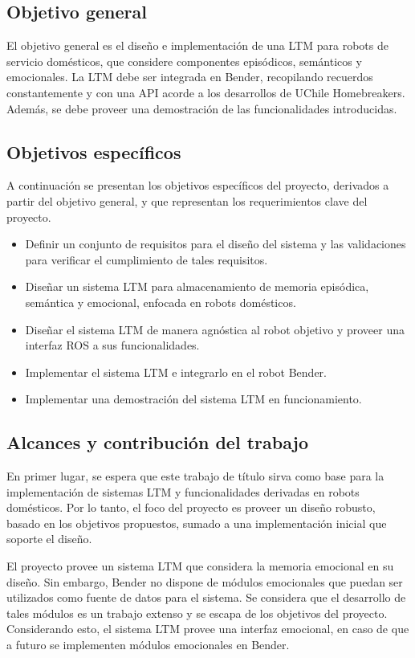 \subsection{Objetivo general}

El objetivo general es el diseño e implementación de una LTM para robots de servicio domésticos, que considere componentes episódicos, semánticos y emocionales. La LTM debe ser integrada en Bender, recopilando recuerdos constantemente y con una API acorde a los desarrollos de UChile Homebreakers. Además, se debe proveer una demostración de las funcionalidades introducidas.


\subsection{Objetivos específicos}

A continuación se presentan los objetivos específicos del proyecto, derivados a partir del objetivo general, y que representan los requerimientos clave del proyecto.
\begin{itemize}
	\item Definir un conjunto de requisitos para el diseño del sistema y las validaciones para verificar el cumplimiento de tales requisitos.
	\item Diseñar un sistema LTM para almacenamiento de memoria episódica, semántica y emocional, enfocada en robots domésticos.
	\item Diseñar el sistema LTM de manera agnóstica al robot objetivo y proveer una interfaz ROS a sus funcionalidades.
	\item Implementar el sistema LTM e integrarlo en el robot Bender.
	\item Implementar una demostración del sistema LTM en funcionamiento.
\end{itemize}

\subsection{Alcances y contribución del trabajo}

En primer lugar, se espera que este trabajo de título sirva como base para la implementación de sistemas LTM y funcionalidades derivadas en robots domésticos. Por lo tanto, el foco del proyecto es proveer un diseño robusto, basado en los objetivos propuestos, sumado a una implementación inicial que soporte el diseño. 

El proyecto provee un sistema LTM que considera la memoria emocional en su diseño. Sin embargo, Bender no dispone de módulos emocionales que puedan ser utilizados como fuente de datos para el sistema. Se considera que el desarrollo de tales módulos es un trabajo extenso y se escapa de los objetivos del proyecto. Considerando esto, el sistema LTM provee una interfaz emocional, en caso de que a futuro se implementen módulos emocionales en Bender.

